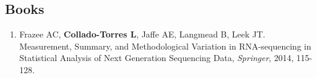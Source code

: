 \subsection{Books}
    \begin{enumerate}
        \item Frazee AC, \textbf{Collado-Torres L}, Jaffe AE, Langmead B, Leek JT. Measurement, Summary, and Methodological Variation in RNA-sequencing in Statistical Analysis of Next Generation Sequencing Data, \emph{Springer}, 2014, 115-128.
    \end{enumerate}

